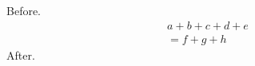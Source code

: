 \documentclass[10pt]{article}
\begin{document}
Before.
\begin{multline} a + b + c + d + e \\ = f + g + h \end{multline}
After.
\end{document}
